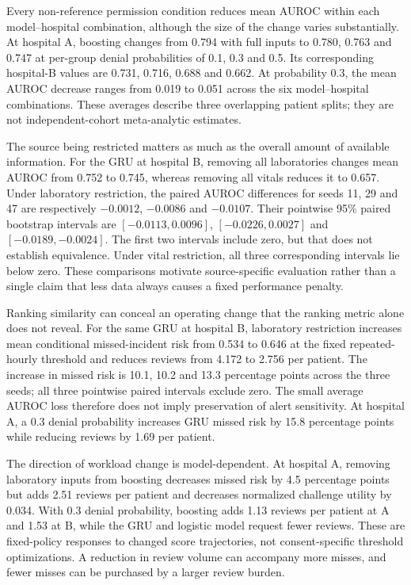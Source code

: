 Every non-reference permission condition reduces mean AUROC within each model--hospital combination, although the size of the change varies substantially. At hospital A, boosting changes from 0.794 with full inputs to 0.780, 0.763 and 0.747 at per-group denial probabilities of 0.1, 0.3 and 0.5. Its corresponding hospital-B values are 0.731, 0.716, 0.688 and 0.662. At probability 0.3, the mean AUROC decrease ranges from 0.019 to 0.051 across the six model--hospital combinations. These averages describe three overlapping patient splits; they are not independent-cohort meta-analytic estimates.

The source being restricted matters as much as the overall amount of available information. For the GRU at hospital B, removing all laboratories changes mean AUROC from 0.752 to 0.745, whereas removing all vitals reduces it to 0.657. Under laboratory restriction, the paired AUROC differences for seeds 11, 29 and 47 are respectively $-0.0012$, $-0.0086$ and $-0.0107$. Their pointwise 95\% paired bootstrap intervals are $[-0.0113,0.0096]$, $[-0.0226,0.0027]$ and $[-0.0189,-0.0024]$. The first two intervals include zero, but that does not establish equivalence. Under vital restriction, all three corresponding intervals lie below zero. These comparisons motivate source-specific evaluation rather than a single claim that less data always causes a fixed performance penalty.

Ranking similarity can conceal an operating change that the ranking metric alone does not reveal. For the same GRU at hospital B, laboratory restriction increases mean conditional missed-incident risk from 0.534 to 0.646 at the fixed repeated-hourly threshold and reduces reviews from 4.172 to 2.756 per patient. The increase in missed risk is 10.1, 10.2 and 13.3 percentage points across the three seeds; all three pointwise paired intervals exclude zero. The small average AUROC loss therefore does not imply preservation of alert sensitivity. At hospital A, a 0.3 denial probability increases GRU missed risk by 15.8 percentage points while reducing reviews by 1.69 per patient.

The direction of workload change is model-dependent. At hospital A, removing laboratory inputs from boosting decreases missed risk by 4.5 percentage points but adds 2.51 reviews per patient and decreases normalized challenge utility by 0.034. With 0.3 denial probability, boosting adds 1.13 reviews per patient at A and 1.53 at B, while the GRU and logistic model request fewer reviews. These are fixed-policy responses to changed score trajectories, not consent-specific threshold optimizations. A reduction in review volume can accompany more misses, and fewer misses can be purchased by a larger review burden.

